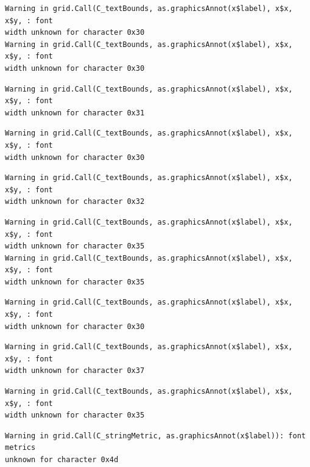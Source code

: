 \documentclass[
  letterpaper,
]{scrbook}
\begin{document}
\begin{verbatim}
Warning in grid.Call(C_textBounds, as.graphicsAnnot(x$label), x$x, x$y, : font
width unknown for character 0x30
Warning in grid.Call(C_textBounds, as.graphicsAnnot(x$label), x$x, x$y, : font
width unknown for character 0x30
\end{verbatim}

\begin{verbatim}
Warning in grid.Call(C_textBounds, as.graphicsAnnot(x$label), x$x, x$y, : font
width unknown for character 0x31
\end{verbatim}

\begin{verbatim}
Warning in grid.Call(C_textBounds, as.graphicsAnnot(x$label), x$x, x$y, : font
width unknown for character 0x30
\end{verbatim}

\begin{verbatim}
Warning in grid.Call(C_textBounds, as.graphicsAnnot(x$label), x$x, x$y, : font
width unknown for character 0x32
\end{verbatim}

\begin{verbatim}
Warning in grid.Call(C_textBounds, as.graphicsAnnot(x$label), x$x, x$y, : font
width unknown for character 0x35
Warning in grid.Call(C_textBounds, as.graphicsAnnot(x$label), x$x, x$y, : font
width unknown for character 0x35
\end{verbatim}

\begin{verbatim}
Warning in grid.Call(C_textBounds, as.graphicsAnnot(x$label), x$x, x$y, : font
width unknown for character 0x30
\end{verbatim}

\begin{verbatim}
Warning in grid.Call(C_textBounds, as.graphicsAnnot(x$label), x$x, x$y, : font
width unknown for character 0x37
\end{verbatim}

\begin{verbatim}
Warning in grid.Call(C_textBounds, as.graphicsAnnot(x$label), x$x, x$y, : font
width unknown for character 0x35
\end{verbatim}

\begin{verbatim}
Warning in grid.Call(C_stringMetric, as.graphicsAnnot(x$label)): font metrics
unknown for character 0x4d
\end{verbatim}
\end{document}
